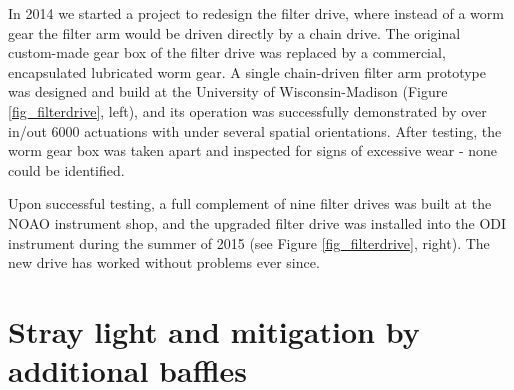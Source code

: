 \documentclass[]{spieman}
\begin{document}
In 2014 we  started a project to redesign the filter drive, where instead of a
worm gear the filter arm would be driven directly by a chain drive. The original
custom-made gear box of the filter drive was replaced by a commercial,
encapsulated lubricated worm gear. A single chain-driven filter arm prototype
was designed and build at the University of Wisconsin-Madison (Figure 
\ref{fig_filterdrive}, left), and
its operation was successfully demonstrated by over in/out 6000 actuations with 
under several spatial orientations. After testing, the worm gear box was taken apart and
inspected for signs of excessive wear - none  could be identified.

Upon successful testing, a full complement of nine filter drives was built at
the NOAO instrument shop, and the upgraded filter drive was installed into the
ODI instrument during the summer of 2015 (see Figure \ref{fig_filterdrive},
right). The new drive has worked without problems ever since.



\section{Stray light and mitigation by additional baffles}
\end{document}
